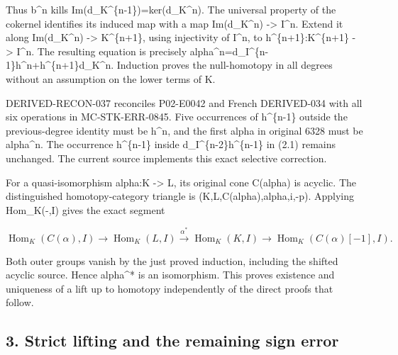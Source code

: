 \documentclass[11pt]{article}
\begin{document}
Thus b\^{}n kills Im(d\_\allowbreak{}K\textasciicircum{}\{n-1\})\allowbreak{}\allowbreak{}=ker(d\_\allowbreak{}K\textasciicircum{}n)\allowbreak{}. The universal property of the cokernel identifies its induced map with a map Im(d\_\allowbreak{}K\textasciicircum{}n)\allowbreak{} \allowbreak{}-> I\^{}n. Extend it along Im(d\_\allowbreak{}K\textasciicircum{}n)\allowbreak{} \allowbreak{}-> K\textasciicircum{}\{n\allowbreak{}+1\},\allowbreak{} using injectivity of I\textasciicircum{}n,\allowbreak{} to h\textasciicircum{}\{n\allowbreak{}+1\}:\allowbreak{}K\textasciicircum{}\{n\allowbreak{}+1\} \allowbreak{}-> I\^{}n. The resulting equation is precisely alpha\textasciicircum{}n\allowbreak{}=d\_\allowbreak{}I\textasciicircum{}\{n-1\}h\textasciicircum{}n\allowbreak{}+h\textasciicircum{}\{n\allowbreak{}+1\}d\_\allowbreak{}K\textasciicircum{}n. Induction proves the null-homotopy in all degrees without an assumption on the lower terms of K.

DERIVED-RECON-037 reconciles P02-E0042 and French DERIVED-034 with all six operations in MC-STK-ERR-0845. Five occurrences of h\^{}\{n-1\} outside the previous-degree identity must be h\textasciicircum{}n,\allowbreak{} and the first alpha in original 6328 must be alpha\^{}n. The occurrence h\^{}\{n-1\} inside d\_\allowbreak{}I\textasciicircum{}\{n-2\}h\textasciicircum{}\{n-1\} in (2.1)\allowbreak{} remains unchanged. The current source implements this exact selective correction.

For a quasi-isomorphism alpha:\allowbreak{}K \allowbreak{}-> L,\allowbreak{} its original cone C(alpha)\allowbreak{} is acyclic. The distinguished homotopy-category triangle is (K,\allowbreak{}L,\allowbreak{}C(alpha)\allowbreak{},\allowbreak{}alpha,\allowbreak{}i,\allowbreak{}-p)\allowbreak{}. Applying Hom\_\allowbreak{}K(-,\allowbreak{}I)\allowbreak{} gives the exact segment

\[
 \operatorname{Hom}_K(C(\alpha),I)\longrightarrow
 \operatorname{Hom}_K(L,I)\xrightarrow{\alpha^*}
 \operatorname{Hom}_K(K,I)\longrightarrow
 \operatorname{Hom}_K(C(\alpha)[-1],I).
\]

Both outer groups vanish by the just proved induction,\allowbreak{} including the shifted acyclic source. Hence alpha\^{}* is an isomorphism. This proves existence and uniqueness of a lift up to homotopy independently of the direct proofs that follow.

\subsection{3. Strict lifting and the remaining sign error}\label{proofs-6209-7089-strict-lifting-and-the-remaining-sign-error}
\end{document}
